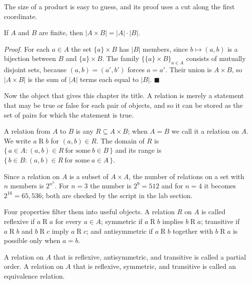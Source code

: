 The size of a product is easy to guess, and its proof uses a cut along the first
coordinate.

\begin{proposisi}
If $A$ and $B$ are finite, then $|A \times B| = |A| \cdot |B|$.
\end{proposisi}
\par\smallskip\noindent\textit{Proof.} For each $a \in A$ the set
$\{a\} \times B$ has $|B|$ members, since $b \mapsto (a,b)$ is a bijection between $B$
and $\{a\} \times B$. The family $\{\{a\} \times B\}_{a \in A}$ consists of mutually
disjoint sets, because $(a,b) = (a',b')$ forces $a = a'$. Their union is $A \times B$,
so $|A \times B|$ is the sum of $|A|$ terms each equal to $|B|$.
\hfill$\blacksquare${\parfillskip=0pt\par}

Now the object that gives this chapter its title. A relation is merely a statement
that may be true or false for each pair of objects, and so it can be stored as the set
of pairs for which the statement is true.

\begin{definisi}[Relation]
A relation from $A$ to $B$ is any $R \subseteq A \times B$; when $A = B$ we call it a
relation on $A$. We write $a \mathrel{R} b$ for $(a,b) \in R$. The domain of $R$ is
$\{\, a \in A : (a,b) \in R\ \text{for some}\ b \in B \,\}$ and its range is
$\{\, b \in B : (a,b) \in R\ \text{for some}\ a \in A \,\}$.
\end{definisi}

Since a relation on $A$ is a subset of $A \times A$, the number of relations on a set
with $n$ members is $2^{n^{2}}$. For $n = 3$ the number is $2^{9} = 512$ and for
$n = 4$ it becomes $2^{16} = 65{,}536$; both are checked by the script in the lab
section.

Four properties filter them into useful objects. A relation $R$ on $A$ is called
reflexive if $a \mathrel{R} a$ for every $a \in A$; symmetric if
$a \mathrel{R} b$ implies $b \mathrel{R} a$; transitive if $a \mathrel{R} b$ and
$b \mathrel{R} c$ imply $a \mathrel{R} c$; and antisymmetric if
$a \mathrel{R} b$ together with $b \mathrel{R} a$ is possible only when $a = b$.

\begin{definisi}
A relation on $A$ that is reflexive, antisymmetric, and transitive is called a partial
order. A relation on $A$ that is reflexive, symmetric, and transitive is called an
equivalence relation.
\end{definisi}

